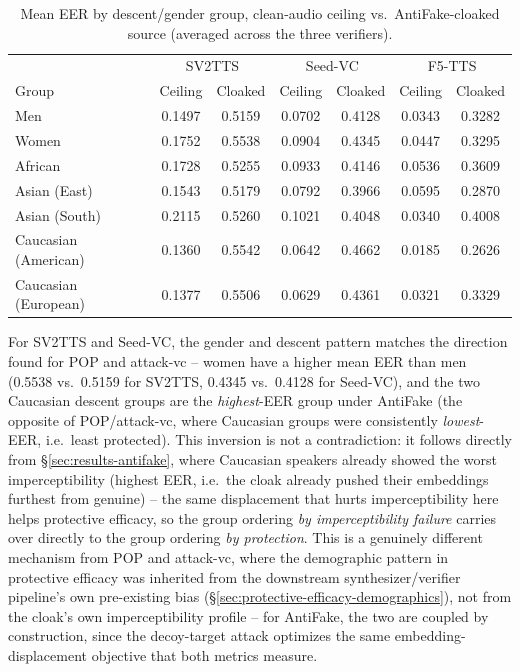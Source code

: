 \documentclass[11pt]{article}
\begin{document}
\begin{table}[H]
\centering
\caption{Mean EER by descent/gender group, clean-audio ceiling vs.\
AntiFake-cloaked source (averaged across the three verifiers).}
\label{tab:protective-efficacy-demographics-antifake}
\begin{tabular}{lcccccc}
\toprule
& \multicolumn{2}{c}{SV2TTS} & \multicolumn{2}{c}{Seed-VC} & \multicolumn{2}{c}{F5-TTS} \\
Group & Ceiling & Cloaked & Ceiling & Cloaked & Ceiling & Cloaked \\
\midrule
Men                  & 0.1497 & 0.5159 & 0.0702 & 0.4128 & 0.0343 & 0.3282 \\
Women                & 0.1752 & 0.5538 & 0.0904 & 0.4345 & 0.0447 & 0.3295 \\
\addlinespace
African              & 0.1728 & 0.5255 & 0.0933 & 0.4146 & 0.0536 & 0.3609 \\
Asian (East)         & 0.1543 & 0.5179 & 0.0792 & 0.3966 & 0.0595 & 0.2870 \\
Asian (South)        & 0.2115 & 0.5260 & 0.1021 & 0.4048 & 0.0340 & 0.4008 \\
Caucasian (American)  & 0.1360 & 0.5542 & 0.0642 & 0.4662 & 0.0185 & 0.2626 \\
Caucasian (European)  & 0.1377 & 0.5506 & 0.0629 & 0.4361 & 0.0321 & 0.3329 \\
\bottomrule
\end{tabular}
\end{table}

For SV2TTS and Seed-VC, the gender and descent pattern matches the
direction found for POP and attack-vc -- women have a higher mean EER
than men (0.5538 vs.\ 0.5159 for SV2TTS, 0.4345 vs.\ 0.4128 for
Seed-VC), and the two Caucasian descent groups are the
\emph{highest}-EER group under AntiFake (the opposite of POP/attack-vc,
where Caucasian groups were consistently \emph{lowest}-EER, i.e.\ least
protected). This inversion is not a contradiction: it follows directly
from \S\ref{sec:results-antifake}, where Caucasian speakers already
showed the worst imperceptibility (highest EER, i.e.\ the cloak already
pushed their embeddings furthest from genuine) -- the same displacement
that hurts imperceptibility here helps protective efficacy, so the
group ordering \emph{by imperceptibility failure} carries over directly
to the group ordering \emph{by protection}. This is a genuinely
different mechanism from POP and attack-vc, where the demographic
pattern in protective efficacy was inherited from the downstream
synthesizer/verifier pipeline's own pre-existing bias
(\S\ref{sec:protective-efficacy-demographics}), not from the cloak's
own imperceptibility profile -- for AntiFake, the two are coupled by
construction, since the decoy-target attack optimizes the same
embedding-displacement objective that both metrics measure.
\end{document}

